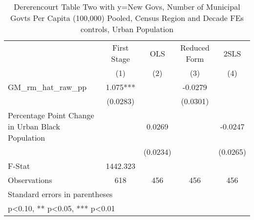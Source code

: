 \begin{table}[htbp]\centering
\def\sym#1{\ifmmode^{#1}\else\(^{#1}\)\fi}
\caption{Dererencourt Table Two with y=New Govs, Number of Municipal Govts Per Capita (100,000) Pooled, Census Region and Decade FEs controls, Urban Population}
\begin{tabular}{l*{4}{c}}
\toprule
                    & First Stage   &         OLS   &Reduced Form   &        2SLS   \\
                    &\multicolumn{1}{c}{(1)}   &\multicolumn{1}{c}{(2)}   &\multicolumn{1}{c}{(3)}   &\multicolumn{1}{c}{(4)}   \\
\midrule
GM\_rm\_hat\_raw\_pp    &       1.075***&               &     -0.0279   &               \\
                    &    (0.0283)   &               &    (0.0301)   &               \\
\addlinespace
Percentage Point Change in Urban Black Population&               &      0.0269   &               &     -0.0247   \\
                    &               &    (0.0234)   &               &    (0.0265)   \\
\midrule
F-Stat              &    1442.323   &               &               &               \\
Observations        &         618   &         456   &         456   &         456   \\
\bottomrule
\multicolumn{5}{l}{\footnotesize Standard errors in parentheses}\\
\multicolumn{5}{l}{\footnotesize * p<0.10, ** p<0.05, *** p<0.01}\\
\end{tabular}
\end{table}
